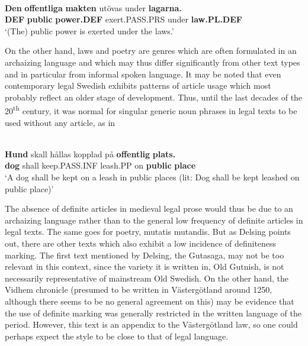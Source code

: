 \ea\label{}
\\
\gll 	\textbf{Den} \textbf{  offentliga} \textbf{  makten} utövas  under  \textbf{lagarna.}\\
		\textbf{DEF} \textbf{public} \textbf{power.DEF} exert.PASS.PRS  under  \textbf{law.PL.DEF}\\
\glt  ‘(The) public power is exerted under the laws.’

\z

On the other hand, laws and poetry are genres which are often formulated in an archaizing language and which may thus differ significantly from other text types and in particular from informal spoken language. It may be noted that even contemporary legal Swedish exhibits patterns of article usage which most probably reflect an older stage of development. Thus, until the last decades of the 20\textsuperscript{th} century, it was normal for singular generic noun phrases in legal texts to be used without any article, as in 

\ea\label{}
\\
\gll	\textbf{Hund} skall  hållas  kopplad  på  \textbf{offentlig} \textbf{  plats.}\\
		\textbf{dog} shall  keep.PASS.INF  leash.PP  on  \textbf{public} \textbf{place}\\
\glt ‘A dog shall be kept on a leash in public places (lit: Dog shall be kept leashed on public place)’

\z

The absence of definite articles in medieval legal prose would thus be due to an archaizing language rather than to the general low frequency of definite articles in legal texts. The same goes for poetry, mutatis mutandis. But as Delsing points out, there are other texts which also exhibit a low incidence of definiteness marking. The first text mentioned by Delsing, the Gutasaga, may not be too relevant in this context, since the variety it is written in, Old Gutnish, is not necessarily representative of mainstream Old Swedish.  On the other hand, the Vidhem chronicle (presumed to be written in Västergötland around 1250, although there seems to be no general agreement on this) may be evidence that the use of definite marking was generally restricted in the written language of the period. However, this text is an appendix to the Västergötland law, so one could perhaps expect the style to be close to that of legal language. 

